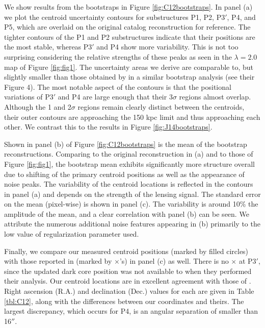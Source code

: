 \documentclass[iop,twocolappendix]{emulateapj}
\newcommand{\cta}[1]{\citetalias{#1}}
\begin{document}
We show results from the \cta{C12} bootstraps in Figure \ref{fig:C12bootstraps}. In panel (a) we plot 
the centroid uncertainty contours for substructures P1, P2, P3$'$, P4, and P5, which are overlaid on 
the original catalog reconstruction for reference. The tighter contours of the P1 and P2 
substructures indicate that their positions are the most stable, whereas P3$'$ and P4 show more 
variability. This is not too surprising considering the relative strengths of these peaks as seen 
in the $\lambda=2.0$ map of Figure \ref{fig:fig1}. The uncertainty areas we derive are comparable 
to, but slightly smaller than those obtained by \cta{C12} in a similar bootstrap analysis (see 
their Figure 4). The most notable aspect of the contours is that the positional variations 
of P3$'$ and P4 are large enough that their 3$\sigma$ regions almost overlap. Although the 1 and 
2$\sigma$ regions remain clearly distinct between the centroids, their outer contours are 
approaching the 150 kpc limit and thus approaching each other. We contrast this to the \cta{J14}
results in Figure \ref{fig:J14bootstraps}.

Shown in panel (b) of Figure \ref{fig:C12bootstraps} is the mean of the bootstrap reconstructions. 
Comparing to the original reconstruction in (a) and to those of Figure \ref{fig:fig1}, the 
bootstrap mean exhibits significantly more structure overall due to shifting of the primary
centroid positions as well as the appearance of noise peaks. The variability of the centroid 
locations is reflected in the contours in panel (a) and depends on the strength of the lensing
signal. The standard error on the mean (pixel-wise) is shown in panel (c). The variability
is around 10\% the amplitude of the mean, and a clear correlation with panel (b) can be seen.
We attribute the numerous additional noise features appearing in (b) primarily to the low value 
of regularization parameter used. 

Finally, we compare our measured centroid positions (marked by filled circles) with those reported in 
\cta{C12} (marked by $\times$'s) in panel (c) as well. There is no $\times$ at P3$'$,
since the updated dark core position was not available to \cta{C12} when they performed their
analysis. Our centroid locations are in excellent agreement with those of \cta{C12}. Right
ascension (R.A.) and declination (Dec.) values for each are given in Table \ref{tbl:C12}, along
with the differences between our coordinates and theirs. The largest discrepancy, which occurs
for P4, is an angular separation of smaller than 16$''$.
\end{document}
